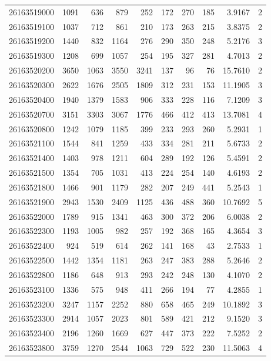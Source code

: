 \documentclass[11pt,landscape]{article}
\begin{document}
{\begin{longtable}[]{@{}lrrrrrrrrr@{}}
26163519000 & 1091 & 636 & 879 & 252 & 172 & 270 & 185 & 3.9167 & 2 \\
26163519100 & 1037 & 712 & 861 & 210 & 173 & 263 & 215 & 3.8375 & 2 \\
26163519200 & 1440 & 832 & 1164 & 276 & 290 & 350 & 248 & 5.2176 & 3 \\
26163519300 & 1208 & 699 & 1057 & 254 & 195 & 327 & 281 & 4.7013 & 2 \\
26163520200 & 3650 & 1063 & 3550 & 3241 & 137 & 96 & 76 & 15.7610 & 2 \\
26163520300 & 2622 & 1676 & 2505 & 1809 & 312 & 231 & 153 & 11.1905 & 3 \\
26163520400 & 1940 & 1379 & 1583 & 906 & 333 & 228 & 116 & 7.1209 & 3 \\
26163520700 & 3151 & 3303 & 3067 & 1776 & 466 & 412 & 413 & 13.7081 & 4 \\
26163520800 & 1242 & 1079 & 1185 & 399 & 233 & 293 & 260 & 5.2931 & 1 \\
26163521100 & 1544 & 841 & 1259 & 433 & 334 & 281 & 211 & 5.6733 & 2 \\
26163521400 & 1403 & 978 & 1211 & 604 & 289 & 192 & 126 & 5.4591 & 2 \\
26163521500 & 1354 & 705 & 1031 & 413 & 224 & 254 & 140 & 4.6193 & 2 \\
26163521800 & 1466 & 901 & 1179 & 282 & 207 & 249 & 441 & 5.2543 & 1 \\
26163521900 & 2943 & 1530 & 2409 & 1125 & 436 & 488 & 360 & 10.7692 & 5 \\
26163522000 & 1789 & 915 & 1341 & 463 & 300 & 372 & 206 & 6.0038 & 2 \\
26163522300 & 1193 & 1005 & 982 & 257 & 192 & 368 & 165 & 4.3654 & 3 \\
26163522400 & 924 & 519 & 614 & 262 & 141 & 168 & 43 & 2.7533 & 1 \\
26163522500 & 1442 & 1354 & 1181 & 263 & 247 & 383 & 288 & 5.2646 & 2 \\
26163522800 & 1186 & 648 & 913 & 293 & 242 & 248 & 130 & 4.1070 & 2 \\
26163523100 & 1336 & 575 & 948 & 411 & 266 & 194 & 77 & 4.2855 & 1 \\
26163523200 & 3247 & 1157 & 2252 & 880 & 658 & 465 & 249 & 10.1892 & 3 \\
26163523300 & 2914 & 1057 & 2023 & 801 & 589 & 421 & 212 & 9.1520 & 3 \\
26163523400 & 2196 & 1260 & 1669 & 627 & 447 & 373 & 222 & 7.5252 & 2 \\
26163523800 & 3759 & 1270 & 2544 & 1063 & 729 & 522 & 230 & 11.5063 & 4 \\

\end{longtable}}
\end{document}

